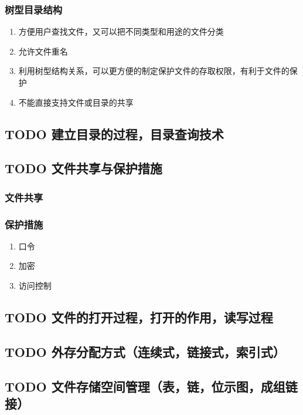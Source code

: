 \documentclass[11pt]{article}
\begin{document}
\subsubsection{树型目录结构}
\label{sec-4-3-3}
\begin{enumerate}
\item 方便用户查找文件，又可以把不同类型和用途的文件分类
\item 允许文件重名
\item 利用树型结构关系，可以更方便的制定保护文件的存取权限，有利于文件的保护
\item 不能直接支持文件或目录的共享
\end{enumerate}
\subsection{{\bfseries\sffamily TODO} 建立目录的过程，目录查询技术}
\label{sec-4-4}
\subsection{{\bfseries\sffamily TODO} 文件共享与保护措施}
\label{sec-4-5}
\subsubsection{文件共享}
\label{sec-4-5-1}
\subsubsection{保护措施}
\label{sec-4-5-2}
\begin{enumerate}
\item 口令
\label{sec-4-5-2-1}
\item 加密
\label{sec-4-5-2-2}
\item 访问控制
\label{sec-4-5-2-3}
\end{enumerate}
\subsection{{\bfseries\sffamily TODO} 文件的打开过程，打开的作用，读写过程}
\label{sec-4-6}
\subsection{{\bfseries\sffamily TODO} 外存分配方式（连续式，链接式，索引式）}
\label{sec-4-7}
\subsection{{\bfseries\sffamily TODO} 文件存储空间管理（表，链，位示图，成组链接）}
\label{sec-4-8}
\end{document}
